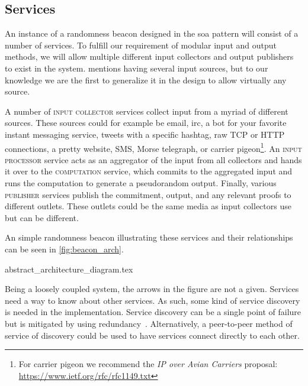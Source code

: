 \subsection{Services}%
\label{sub:components_of_a_beacon}

An instance of a randomness beacon designed in the \gls{soa} pattern will consist of a number of services.
To fulfill our requirement of modular input and output methods, we will allow multiple different input collectors and output publishers to exist in the system. \citet{randomzoo} mentions having several input sources, but to our knowledge we are the first to generalize it in the design to allow virtually any source.

A number of \textsc{input collector} services collect input from a myriad of different sources. These sources could for example be email, irc, a bot for your favorite instant messaging service, tweets with a specific hashtag, raw TCP or HTTP connections, a pretty website, SMS, Morse telegraph, or carrier pigeon\footnote{For carrier pigeon we recommend the \emph{IP over Avian Carriers} proposal: \url{https://www.ietf.org/rfc/rfc1149.txt}}.
An \textsc{input processor} service acts as an aggregator of the input from all collectors and hands it over to the \textsc{computation} service, which commits to the aggregated input and runs the computation to generate a pseudorandom output.
Finally, various \textsc{publisher} services publish the commitment, output, and any relevant proofs to different outlets. These outlets could be the same media as input collectors use but can be different.

An simple randomness beacon illustrating these services and their relationships can be seen in \cref{fig:beacon_arch}.

{abstract_architecture_diagram.tex}

Being a loosely coupled system, the arrows in the figure are not a given.
Services need a way to know about other services.
As such, some kind of service discovery is needed in the implementation.
Service discovery can be a single point of failure but is mitigated by using redundancy~\cite{soa_redundancy}.
Alternatively, a peer-to-peer method of service of discovery could be used to have services connect directly to each other.
